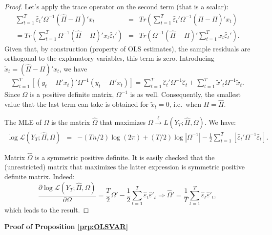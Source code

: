 \documentclass[
  11pt,
]{book}
\theoremstyle{definition}
\theoremstyle{definition}
\theoremstyle{definition}
\theoremstyle{definition}
\theoremstyle{remark}
\begin{document}
\begin{proof}
Let's apply the trace operator on the second term (that is a scalar):
\begin{eqnarray*}
\sum_{t=1}^{T}\hat{\varepsilon}_{t}'\Omega^{-1}(\hat{\Pi}-\Pi)'x_{t} & = & Tr\left(\sum_{t=1}^{T}\hat{\varepsilon}_{t}'\Omega^{-1}(\hat{\Pi}-\Pi)'x_{t}\right)\\
=  Tr\left(\sum_{t=1}^{T}\Omega^{-1}(\hat{\Pi}-\Pi)'x_{t}\hat{\varepsilon}_{t}'\right) & = & Tr\left(\Omega^{-1}(\hat{\Pi}-\Pi)'\sum_{t=1}^{T}x_{t}\hat{\varepsilon}_{t}'\right).
\end{eqnarray*}
Given that, by construction (property of OLS estimates), the sample residuals are orthogonal to the explanatory variables, this term is zero. Introducing \(\tilde{x}_{t}=(\hat{\Pi}-\Pi)'x_{t}\), we have
\begin{eqnarray*}
\sum_{t=1}^{T}\left[\left(y_{t}-\Pi'x_{t}\right)'\Omega^{-1}\left(y_{t}-\Pi'x_{t}\right)\right] =\sum_{t=1}^{T}\hat{\varepsilon}_{t}'\Omega^{-1}\hat{\varepsilon}_{t}+\sum_{t=1}^{T}\tilde{x}'_{t}\Omega^{-1}\tilde{x}_{t}.
\end{eqnarray*}
Since \(\Omega\) is a positive definite matrix, \(\Omega^{-1}\) is as well. Consequently, the smallest value that the last term can take is obtained for \(\tilde{x}_{t}=0\), i.e.~when \(\Pi=\hat{\Pi}.\)

The MLE of \(\Omega\) is the matrix \(\hat{\Omega}\) that maximizes \(\Omega\overset{\ell}{\rightarrow}L(Y_{T};\hat{\Pi},\Omega)\). We have:
\begin{eqnarray*}
\log\mathcal{L}(Y_{T};\hat{\Pi},\Omega) & = & -(Tn/2)\log(2\pi)+(T/2)\log\left|\Omega^{-1}\right| -\frac{1}{2}\sum_{t=1}^{T}\left[\hat{\varepsilon}_{t}'\Omega^{-1}\hat{\varepsilon}_{t}\right].
\end{eqnarray*}

Matrix \(\hat{\Omega}\) is a symmetric positive definite. It is easily checked that the (unrestricted) matrix that maximizes the latter expression is symmetric positive definite matrix. Indeed:
\[
\frac{\partial \log\mathcal{L}(Y_{T};\hat{\Pi},\Omega)}{\partial\Omega}=\frac{T}{2}\Omega'-\frac{1}{2}\sum_{t=1}^{T}\hat{\varepsilon}_{t}\hat{\varepsilon}'_{t}\Rightarrow\hat{\Omega}'=\frac{1}{T}\sum_{t=1}^{T}\hat{\varepsilon}_{t}\hat{\varepsilon}'_{t},
\]
which leads to the result.
\end{proof}

\textbf{Proof of Proposition \ref{prp:OLSVAR}}
\end{document}
